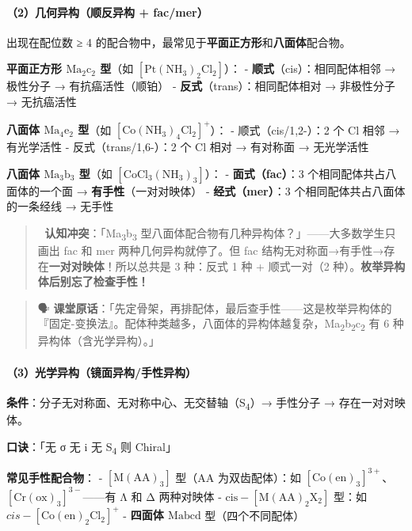 \documentclass[a4paper,11pt]{ctexart}
\begin{document}
\paragraph{（2）几何异构（顺反异构 + fac/mer）}\label{ux51e0ux4f55ux5f02ux6784ux987aux53cdux5f02ux6784-facmer}

出现在配位数 ≥ 4 的配合物中，最常见于\textbf{平面正方形}和\textbf{八面体}配合物。

\textbf{平面正方形 \(\mathrm{Ma_2c_2}\) 型}（如 \([\mathrm{Pt(NH_3)_2Cl_2}]\)）：
- \textbf{顺式}（cis）：相同配体相邻 → 极性分子 → 有抗癌活性（顺铂）
- \textbf{反式}（trans）：相同配体相对 → 非极性分子 → 无抗癌活性

\textbf{八面体 \(\mathrm{Ma_4e_2}\) 型}（如 \([\mathrm{Co(NH_3)_4Cl_2}]^+\)）：
- 顺式（cis/1,2-）：2 个 Cl 相邻 → 有光学活性
- 反式（trans/1,6-）：2 个 Cl 相对 → 有对称面 → 无光学活性

\textbf{八面体 \(\mathrm{Ma_3b_3}\) 型}（如 \([\mathrm{CoCl_3(NH_3)_3}]\)）：
- \textbf{面式（fac）}：3 个相同配体共占八面体的一个面 → \textbf{有手性}（一对对映体）
- \textbf{经式（mer）}：3 个相同配体共占八面体的一条经线 → 无手性

\begin{quote}
🧠 \textbf{认知冲突}：「Ma\textsubscript{3}b\textsubscript{3} 型八面体配合物有几种异构体？」------大多数学生只画出 fac 和 mer 两种几何异构就停了。但 fac 结构无对称面→有手性→存在\textbf{一对对映体}！所以总共是 3 种：反式 1 种 + 顺式一对（2 种）。\textbf{枚举异构体后别忘了检查手性！}
\end{quote}

\begin{quote}
🗣️ \textbf{课堂原话}：「先定骨架，再排配体，最后查手性------这是枚举异构体的『固定-变换法』。配体种类越多，八面体的异构体越复杂，Ma\textsubscript{2}b\textsubscript{2}c\textsubscript{2} 有 6 种异构体（含光学异构）。」
\end{quote}

\paragraph{（3）光学异构（镜面异构/手性异构）}\label{ux5149ux5b66ux5f02ux6784ux955cux9762ux5f02ux6784ux624bux6027ux5f02ux6784}

\textbf{条件}：分子无对称面、无对称中心、无交替轴（S\textsubscript{4}）→ 手性分子 → 存在一对对映体。

\textbf{口诀}：「无 σ 无 i 无 S\textsubscript{4} 则 Chiral」

\textbf{常见手性配合物}：
- \(\mathrm{[M(AA)_3]}\) 型（AA 为双齿配体）：如 \([\mathrm{Co(en)_3}]^{3+}\)、\([\mathrm{Cr(ox)_3}]^{3-}\)------有 Λ 和 Δ 两种对映体
- \(\mathrm{cis-[M(AA)_2X_2]}\) 型：如 \(cis-[\mathrm{Co(en)_2Cl_2}]^+\)
- \textbf{四面体 \(\mathrm{Mabcd}\)} 型（四个不同配体）
\end{document}
